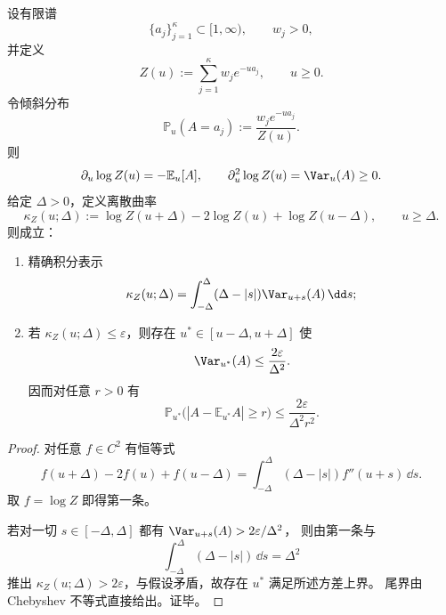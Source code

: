 \begin{theorem}[离散曲率控制下的近单模态刚性]\label{thm:xi-discrete-curvature-near-unimodal-rigidity}
设有限谱
\[
\{a_j\}_{j=1}^{\kappa}\subset[1,\infty),\qquad w_j>0,
\]
并定义
\[
Z(u):=\sum_{j=1}^{\kappa}w_j e^{-ua_j},\qquad u\ge0.
\]
令倾斜分布
\[
\mathbb P_u(A=a_j):=\frac{w_j e^{-ua_j}}{Z(u)}.
\]
则
\[
\partial_u\log Z(u)=-\mathbb E_u[A],\qquad
\partial_u^2\log Z(u)=\Var_u(A)\ge0.
\]
给定 \(\Delta>0\)，定义离散曲率
\[
\kappa_Z(u;\Delta):=\log Z(u+\Delta)-2\log Z(u)+\log Z(u-\Delta),
\qquad u\ge\Delta.
\]
则成立：
\begin{enumerate}
  \item 精确积分表示
  \[
  \kappa_Z(u;\Delta)=
  \int_{-\Delta}^{\Delta}(\Delta-|s|)\Var_{u+s}(A)\,\dd s;
  \]
  \item 若 \(\kappa_Z(u;\Delta)\le\varepsilon\)，则存在 \(u^\ast\in[u-\Delta,u+\Delta]\) 使
  \[
  \Var_{u^\ast}(A)\le\frac{2\varepsilon}{\Delta^2}.
  \]
  因而对任意 \(r>0\) 有
  \[
  \mathbb P_{u^\ast}\!\bigl(|A-\mathbb E_{u^\ast}A|\ge r\bigr)
  \le
  \frac{2\varepsilon}{\Delta^2r^2}.
  \]
\end{enumerate}
\end{theorem}
\begin{proof}
对任意 \(f\in C^2\) 有恒等式
\[
f(u+\Delta)-2f(u)+f(u-\Delta)
=
\int_{-\Delta}^{\Delta}(\Delta-|s|)f''(u+s)\,\dd s.
\]
取 \(f=\log Z\) 即得第一条。

若对一切 \(s\in[-\Delta,\Delta]\) 都有
\(
\Var_{u+s}(A)>2\varepsilon/\Delta^2
\)，
则由第一条与
\[
\int_{-\Delta}^{\Delta}(\Delta-|s|)\,\dd s=\Delta^2
\]
推出 \(\kappa_Z(u;\Delta)>2\varepsilon\)，与假设矛盾，故存在 \(u^\ast\) 满足所述方差上界。
尾界由 Chebyshev 不等式直接给出。证毕。
\end{proof}

